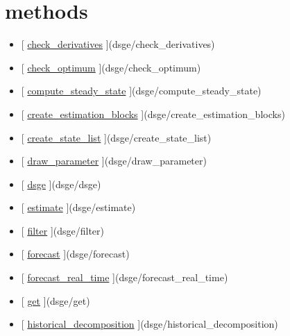 \documentclass[letterpaper,10pt,english]{sphinxmanual}
\begin{document}
\section{methods}
\label{classes/models/@dsge/dsge:methods}\begin{itemize}
\item {} 
{[} {\hyperref[classes/models/@dsge/dsge:check-derivatives]{check\_derivatives}} {]}(dsge/check\_derivatives)

\item {} 
{[} {\hyperref[classes/models/@dsge/dsge:check-optimum]{check\_optimum}} {]}(dsge/check\_optimum)

\item {} 
{[} {\hyperref[classes/models/@dsge/dsge:compute-steady-state]{compute\_steady\_state}} {]}(dsge/compute\_steady\_state)

\item {} 
{[} {\hyperref[classes/models/@dsge/dsge:create-estimation-blocks]{create\_estimation\_blocks}} {]}(dsge/create\_estimation\_blocks)

\item {} 
{[} {\hyperref[classes/models/@dsge/dsge:create-state-list]{create\_state\_list}} {]}(dsge/create\_state\_list)

\item {} 
{[} {\hyperref[classes/models/@dsge/dsge:draw-parameter]{draw\_parameter}} {]}(dsge/draw\_parameter)

\item {} 
{[} {\hyperref[classes/models/@dsge/dsge:dsge]{dsge}} {]}(dsge/dsge)

\item {} 
{[} {\hyperref[classes/models/@dsge/dsge:estimate]{estimate}} {]}(dsge/estimate)

\item {} 
{[} {\hyperref[classes/models/@dsge/dsge:filter]{filter}} {]}(dsge/filter)

\item {} 
{[} {\hyperref[classes/models/@dsge/dsge:forecast]{forecast}} {]}(dsge/forecast)

\item {} 
{[} {\hyperref[classes/models/@dsge/dsge:forecast-real-time]{forecast\_real\_time}} {]}(dsge/forecast\_real\_time)

\item {} 
{[} {\hyperref[classes/models/@dsge/dsge:get]{get}} {]}(dsge/get)

\item {} 
{[} {\hyperref[classes/models/@dsge/dsge:historical-decomposition]{historical\_decomposition}} {]}(dsge/historical\_decomposition)


\end{itemize}
\end{document}
